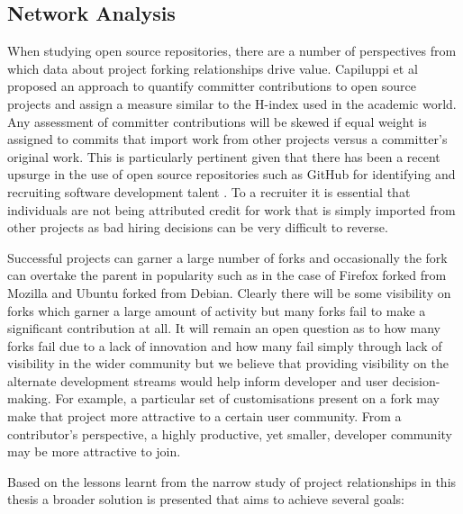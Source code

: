 \subsection{Network Analysis}
When studying open source repositories, there are a number of perspectives from which data about project forking relationships drive value. Capiluppi et al \citep{capiluppi2012developing} proposed  an approach to quantify committer contributions to open source projects and assign a measure similar to the H-index used in the academic world. Any assessment of committer contributions will be skewed if equal weight is assigned to commits that import work from other projects versus a committer's original work.  This is particularly pertinent given that there has been a recent upsurge in the use of open source repositories such as GitHub for identifying and recruiting software development talent \citep{ISO15504}. To a recruiter it is essential that individuals are not being attributed credit for work that is simply imported from other projects as bad hiring decisions can be very difficult to reverse.

Successful projects can garner a large number of forks and occasionally the fork can overtake the parent in popularity such as in the case of Firefox forked from Mozilla and Ubuntu forked from Debian. Clearly there will be some visibility on forks which garner a large amount of activity but many forks fail to make a significant contribution at all. It will remain an open question as to how many forks fail due to a lack of innovation and how many fail simply through lack of visibility in the wider community but we believe that providing visibility on the  alternate development streams would help inform developer and user decision-making. For example, a particular set of customisations present on a fork may make that project more attractive to a certain user community. From a contributor's perspective, a highly productive, yet smaller, developer community may be more attractive to join.

Based on the lessons learnt from the narrow study of project relationships in this thesis a broader solution is presented that aims to achieve several goals:

